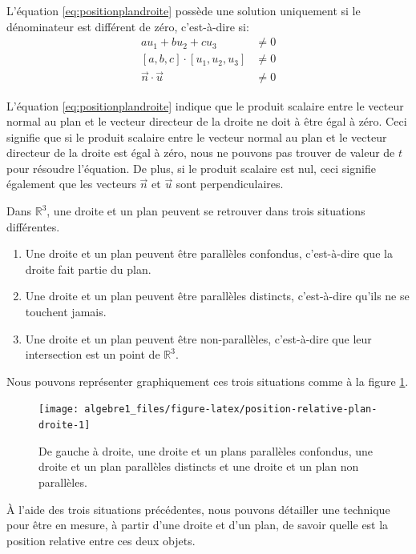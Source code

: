 \documentclass[]{book}
\providecommand{\tightlist}{%
  \setlength{\itemsep}{0pt}\setlength{\parskip}{0pt}}
\theoremstyle{definition}
\theoremstyle{definition}
\theoremstyle{definition}
\theoremstyle{remark}
\begin{document}
L'équation \eqref{eq:positionplandroite} possède une solution uniquement si le dénominateur est différent de zéro, c'est-à-dire si:
\begin{align*}
au_1+bu_2+cu_3 &\neq 0 \\
[a,b,c]\cdot[u_1,u_2,u_3] &\neq 0 \\
\vec n \cdot \vec u &\neq 0
\end{align*}

L'équation \eqref{eq:positionplandroite} indique que le produit scalaire entre le vecteur normal au plan et le vecteur directeur de la droite ne doit à être égal à zéro. Ceci signifie que si le produit scalaire entre le vecteur normal au plan et le vecteur directeur de la droite est égal à zéro, nous ne pouvons pas trouver de valeur de \(t\) pour résoudre l'équation. De plus, si le produit scalaire est nul, ceci signifie également que les vecteurs \(\vec n\) et \(\vec u\) sont perpendiculaires.

Dans \(\mathbb{R}^3\), une droite et un plan peuvent se retrouver dans trois situations différentes.

\begin{enumerate}
\def\labelenumi{\arabic{enumi}.}
\tightlist
\item
  Une droite et un plan peuvent être parallèles confondus, c'est-à-dire que la droite fait partie du plan.
\item
  Une droite et un plan peuvent être parallèles distincts, c'est-à-dire qu'ils ne se touchent jamais.
\item
  Une droite et un plan peuvent être non-parallèles, c'est-à-dire que leur intersection est un point de \(\mathbb{R}^3\).
\end{enumerate}

Nous pouvons représenter graphiquement ces trois situations comme à la figure \ref{fig:position-relative-plan-droite}.

\begin{figure}

{\centering \texttt{[image: algebre1\_files/figure-latex/position-relative-plan-droite-1]} 

}

\caption{De gauche à droite, une droite et un plans parallèles confondus, une droite et un plan parallèles distincts et une droite et un plan non parallèles.}\label{fig:position-relative-plan-droite}
\end{figure}

À l'aide des trois situations précédentes, nous pouvons détailler une technique pour être en mesure, à partir d'une droite et d'un plan, de savoir quelle est la position relative entre ces deux objets.
\end{document}
